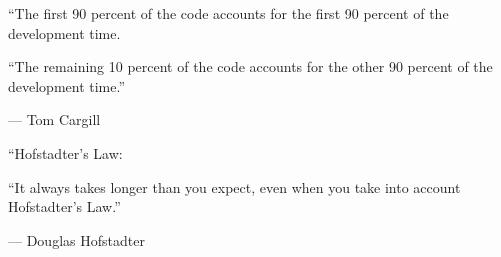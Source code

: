 \documentclass{../fal_assignment}
\begin{document}
\begin{marginquote}
    ``The first 90 percent of the code accounts for the first 90 percent of the development time.
    
    ``The remaining 10 percent of the code accounts for the other 90 percent of the development time.''
    
    --- Tom Cargill
    
    \marginquoterule
    
    ``Hofstadter's Law:
    
    ``It always takes longer than you expect, even when you take into account Hofstadter's Law.''
    
    --- Douglas Hofstadter
\end{marginquote}
\end{document}
